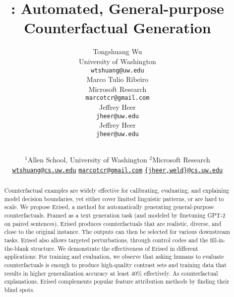 \documentclass[11pt,a4paper]{article}
\title{\sysname: Automated, General-purpose Counterfactual Generation}
\author{
Tongshuang Wu \\
  University of Washington \\
  \texttt{wtshuang@uw.edu} \\\And
Marco Tulio Ribeiro \\
  Microsoft Research \\
  \texttt{marcotcr@gmail.com} \\\And
Jeffrey Heer \\
  \texttt{jheer@uw.edu} \\\And
Jeffrey Heer \\
  \texttt{jheer@uw.edu} \\
}
\author{
\makecell{
Tongshuang Wu$^{1}$ ~~~~~~~ 
Marco Tulio Ribeiro$^{2}$ ~~~~~~~ 
Jeffrey Heer$^{1}$ ~~~~~ 
Daniel S. Weld$^{1}$}  \\ 
$^{1}$Allen School, University of Washington\hspace{5mm}
$^{2}$Microsoft Research\hspace{5mm} \\ 
\href{mailto:wtshuang@cs.uw.edu}{\texttt {wtshuang@cs.uw.edu}}
\hspace{2mm}
\href{mailto:marcotcr@microsoft.com}{\texttt {marcotcr@gmail.com}}
\hspace{2mm}
\href{mailto:dan@cs.washington.edu}{\texttt {\{jheer,weld\}@cs.uw.edu}}
}
\date{}
\newcommand{\sysname}{{\color{red}Erised}\xspace}
\newcommand{\tagstrs}{control codes\xspace}
\begin{document}
\maketitle
\begin{abstract}
Counterfactual examples are widely effective for calibrating, evaluating, and explaining model decision boundaries, yet either cover limited linguistic patterns, or are hard to scale.
We propose \sysname, a method for automatically generating general-purpose counterfactuals. 
Framed as a text generation task (and modeled by finetuning GPT-2 on paired sentences), \sysname produces counterfactuals that are  realistic, diverse, and close to the original instance.
The outputs can then be selected for various downstream tasks. 
\sysname also allows targeted perturbations, through \tagstrs and the fill-in-the-blank structure.
We demonstrate the effectiveness of \sysname in different applications:
For training and evaluation, we observe that asking humans to evaluate counterfactuals is enough to produce high-quality contrast sets and training data that results in higher generalization accuracy at least 40\% effectively.
As counterfactual explanations, \sysname complements popular feature attribution methods by finding their blind spots.
\end{abstract}


%










\clearpage
\newpage

\appendix







\end{document}
